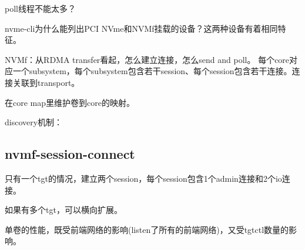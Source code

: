 poll线程不能太多？

nvme-cli为什么能列出PCI NVme和NVMf挂载的设备？这两种设备有着相同特征。

NVMf：从RDMA transfer看起，怎么建立连接，怎么send and poll。 
每个core对应一个subsystem，每个subsystem包含若干session、每个session包含若干连接。连接关联到transport。

在core map里维护卷到core的映射。

discovery机制：

\subsection{nvmf-session-connect}


只有一个tgt的情况，建立两个session，每个session包含1个admin连接和2个io连接。

如果有多个tgt，可以横向扩展。

单卷的性能，既受前端网络的影响(listen了所有的前端网络)，又受tgtctl数量的影响。

